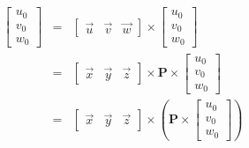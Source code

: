 \documentclass[12pt]{article}
\begin{document}
    \begin{eqnarray*}
        \left[ \begin{array}{c} u_0 \\ v_0 \\ w_0 \end{array} \right] &
        = &
        \left[ \begin{array}{ccc}
            \overrightarrow{u} & \overrightarrow{v} & \overrightarrow{w}
        \end{array} \right]
        \times
        \left[ \begin{array}{c} u_0 \\ v_0 \\ w_0 \end{array} \right] \\
        & = &
        \left[ \begin{array}{ccc}
        \overrightarrow{x} & \overrightarrow{y} & \overrightarrow{z}
        \end{array} \right]
        \times
        \textbf{P}
        \times
        \left[ \begin{array}{c} u_0 \\ v_0 \\ w_0 \end{array} \right] \\
        & = &
        \left[ \begin{array}{ccc}
        \overrightarrow{x} & \overrightarrow{y} & \overrightarrow{z}
        \end{array} \right]
        \times
        \left(
            \textbf{P}
            \times
            \left[ \begin{array}{c} u_0 \\ v_0 \\ w_0 \end{array} \right]
        \right)
    \end{eqnarray*}
\end{document}
